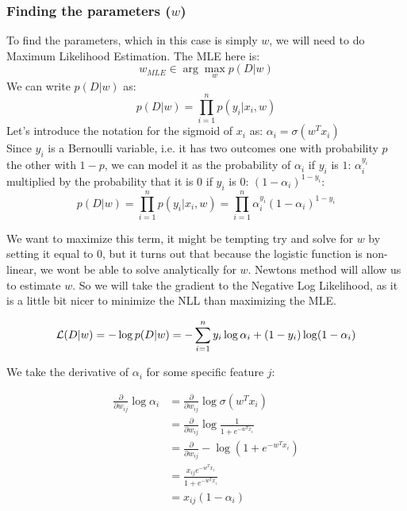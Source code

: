     \subsubsection{Finding the parameters ($w$)}
    To find the parameters, which in this case is simply $w$, we will need to 
    do Maximum Likelihood Estimation. The MLE here is:
    \begin{equation*}
        w_{MLE} \in \arg\max_w p(D|w)
    \end{equation*}
    We can write $p(D|w)$ as:
    \begin{equation*}
        p(D|w)=\prod_{i=1}^{n} p(y_i|x_i, w)
    \end{equation*}
    Let's introduce the notation for the sigmoid of $x_i$ as: 
    $\alpha_i=\sigma(w^Tx_i)$\\
    Since $y_i$ is a Bernoulli variable, i.e. it has two outcomes one with 
    probability $p$ the other with $1-p$, we can model it as the probability of 
    $\alpha_i$ if $y_i$ is $1$: $\alpha_i^{y_i}$ multiplied by the probability 
    that it is $0$ if $y_i$ is $0$: $(1-\alpha_i)^{1-y_i}$:
    \begin{equation*}
        p(D|w)=\prod_{i=1}^{n} p(y_i|x_i, 
        w)=\prod_{i=1}^{n}\alpha_i^{y_i}(1-\alpha_i)^{1-y_i}
    \end{equation*}
    
    We want to maximize this term, it might be tempting try and solve for $w$ 
    by setting it equal to $0$, but it turns out that because the logistic 
    function is non-linear, we wont be able to solve analytically for $w$. 
    Newtons method will allow us to estimate $w$. So we will take the gradient 
    to the Negative Log Likelihood, as it is a little bit nicer to minimize the 
    NLL than maximizing the MLE.
    
    \begin{equation*}
        \mathcal{L}(D | w)=-\log p(D|w) = - \sum_{i=1}^{n} 
        y_i\log\alpha_i+(1-y_i)\log(1-\alpha_i)
    \end{equation*}
    
    We take the derivative of $\alpha_i$ for some specific feature $j$:
    
    \begin{align*}
        \frac{\partial}{\partial w_{ij}}\log\alpha_i &= 
        \frac{\partial}{\partial w_{ij}}\log\sigma(w^Tx_i)\\
            &=\frac{\partial}{\partial w_{ij}} \log\frac{1}{1+e^{-w^Tx_i}} \\
            &=\frac{\partial}{\partial w_{ij}} -\log(1+e^{-w^Tx_i})\\
            &=\frac{x_{ij} e^{-w^Tx_i}}{1+e^{-w^Tx_i}}\\
            &=x_{ij}(1-\alpha_i)
    \end{align*}
    
